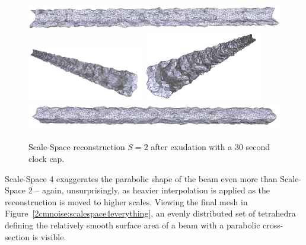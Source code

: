 \documentclass[12pt]{drexelthesis}
\begin{document}
\begin{figure}[!ht]
	\centering
		\includegraphics[width=5in]{simulated-lab-scan/2cmnoise/optimizedNeat/scalespace2everything00.png}
		\includegraphics[width=2in]{simulated-lab-scan/2cmnoise/optimizedNeat/scalespace2everything01.png}
		\includegraphics[width=2in]{simulated-lab-scan/2cmnoise/optimizedNeat/scalespace2everything02.png}
		\includegraphics[width=5in]{simulated-lab-scan/2cmnoise/optimizedNeat/scalespace2everything03.png}
		\caption[Scale-Space reconstruction $S = 2$ after after exudation with a 30 second clock cap]{\centering Scale-Space reconstruction $S = 2$ after exudation with a 30 second clock cap.}
	\label{2cmnoise:scalespace2everything}
\end{figure}

Scale-Space 4 exaggerates the parabolic shape of the beam even more than Scale-Space 2 -- again, unsurprisingly, as heavier interpolation is applied as the reconstruction is moved to higher scales. Viewing the final mesh in Figure~\ref{2cmnoise:scalespace4everything}, an evenly distributed set of tetrahedra defining the relatively smooth surface area of a beam with a parabolic cross-section is visible.
\end{document}
